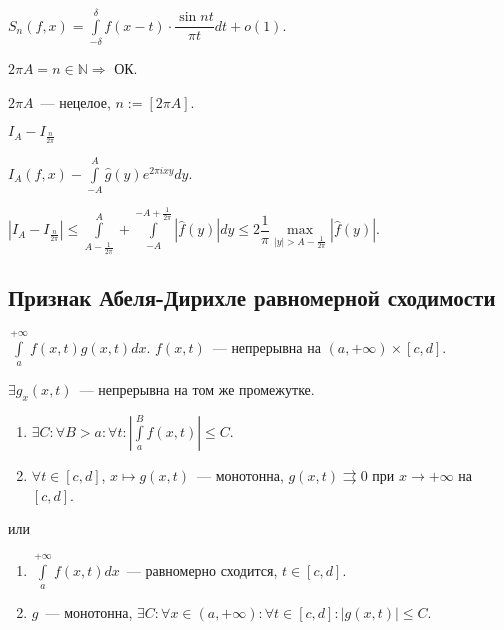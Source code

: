 \documentclass{article}
\begin{document}
            $S_n(f, x) = \int\limits^{\delta}_{-\delta} f(x - t) \cdot \dfrac{\sin nt}{\pi t} dt + o(1)$.
            
            $2 \pi A = n \in \mathbb{N} \Rightarrow$ ОК.
            
            $2 \pi A$~--- нецелое, $n := [2 \pi A]$.
            
            $I_A - I_{\frac{n}{2 \pi}}$
            
            $I_A (f, x) - \int\limits^A_{-A} \hat{g}(y) e^{2 \pi i x y} dy$.
            
            $\left| I_A - I_{\frac{n}{2 \pi}} \right| \leqslant \int\limits^A_{A - \frac{1}{2 \pi}} + \int\limits^{-A + \frac{1}{2 \pi}}_{-A} |\hat{f}(y)|dy \leqslant 2 \dfrac{1}{\pi} \max\limits_{|y| > A - \frac{1}{2 \pi}} | \hat{f} (y) |$.
            
    \subsection{Признак Абеля-Дирихле равномерной сходимости}
        
        $\int\limits^{+\infty}_a f(x, t) g(x, t) dx$. $f(x, t)$~--- непрерывна на $(a, +\infty) \times [c, d]$.
        
        $\exists g_x(x, t)$~--- непрерывна на том же промежутке.
        
        \begin{enumerate}
        
            \item $\exists C : \forall B > a : \forall t : \left| \int\limits^B_a f(x, t) \right| \leqslant C$.
            
            \item $\forall t \in [c, d]$, $x \mapsto g(x, t)$~--- монотонна, $g(x, t) \rightrightarrows 0$ при $x \rightarrow +\infty$ на $[c, d]$.
            
        \end{enumerate}
        
        или
        
        \begin{enumerate}
        
            \item $\int\limits^{+\infty}_a f(x, t) dx$~--- равномерно сходится, $t \in [c, d]$.
            
            \item $g$~--- монотонна, $\exists C : \forall x \in (a, +\infty) : \forall t \in [c, d] : | g(x, t) | \leqslant C$.
            
        \end{enumerate}
    
\end{document}
